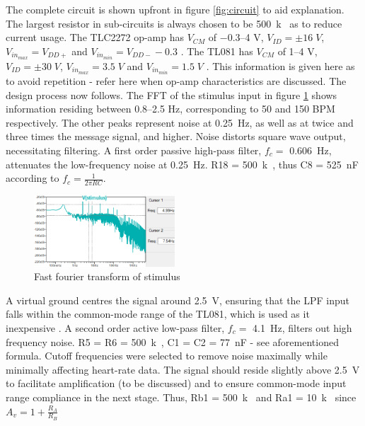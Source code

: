 The complete circuit is shown upfront in figure \ref{fig:circuit} to aid explanation. The largest resistor in sub-circuits is always chosen to be \SI{500}{k\Omega} as to reduce current usage. The TLC2272 op-amp has $V_{CM}$ of \numrange{-0.3}{4} \si{V}, $V_{ID} = \pm 16 \; V$, $V_{in_{max}} = V_{DD+}$ and $V_{in_{min}} = V_{DD-} - 0.3$ \cite{tlc2272}. The TL081 has $V_{CM}$ of \numrange{1}{4} \si{V}, $V_{ID} = \pm 30 \;V$, $V_{in_{max}} = 3.5 \;V$ and $V_{in_{min}} = 1.5 \;V$ \cite{tl081}. This information is given here as to avoid repetition - refer here when op-amp characteristics are discussed. The design process now follows.
The FFT of the stimulus input in figure \ref{fig:fft} shows information residing between \numrange{0.8}{2.5} \si{Hz}, corresponding to 50 and 150 BPM respectively. The other peaks represent noise at \SI{0.25}{Hz}, as well as at twice and three times the message signal, and higher. Noise distorts square wave output, necessitating filtering. A first order passive high-pass filter, $f_c =$ \SI{0.606}{Hz}, attenuates the low-frequency noise at \SI{0.25}{Hz}. R18 = \SI{500}{k\Omega}, thus C8 = \SI{525}{nF} according to $f_{c} = \frac{1}{2\pi R C}$. 
\begin{figure}
    \centering
    \includegraphics[width = 0.47\textwidth]{./Figures/fft}
    \caption{Fast fourier transform of stimulus}
    \label{fig:fft}
\end{figure}
A virtual ground centres the signal around \SI{2.5}{V}, ensuring that the LPF input falls within the common-mode range of the TL081, which is used as it inexpensive \cite{octo}. A second order active low-pass filter, $f_c =$ \SI{4.1}{Hz}, filters out high frequency noise. R5 = R6 = \SI{500}{k\Omega}, C1 = C2 = \SI{77}{nF} - see aforementioned formula. Cutoff frequencies were selected to remove noise maximally while minimally affecting heart-rate data. The signal should reside slightly above \SI{2.5}{V} to facilitate amplification (to be discussed) and to ensure common-mode input range compliance in the next stage. Thus, Rb1 = \SI{500}{k\Omega} and Ra1 = \SI{10}{k\Omega} since $A_v=1+\frac{R_{A}}{R_{B}}$ 
